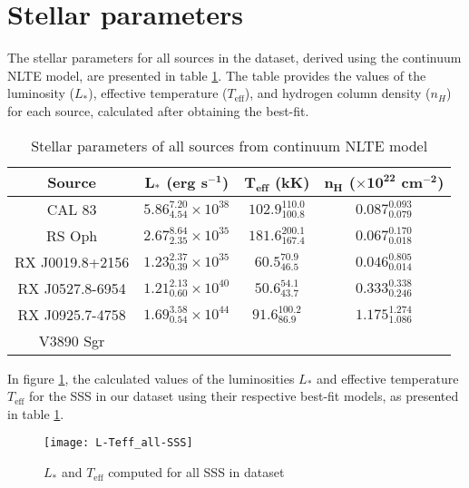 	\section{Stellar parameters}
		The stellar parameters for all sources in the dataset, derived using the continuum NLTE model, are presented in table \ref{tab:sss-stellar-params}. The table provides the values of the luminosity ($L_*$), effective temperature ($T_\text{eff}$), and hydrogen column density ($n_H$) for each source, calculated after obtaining the best-fit.
		\renewcommand{\arraystretch}{1.8}
		\begin{table}[!htb]
			\centering
			\caption{Stellar parameters of all sources from continuum NLTE model}
			\label{tab:sss-stellar-params}
			\begin{tabular}{cccc}
			\hline
			{\textbf{Source}} & {$\boldsymbol{L_*}$ \textbf{(erg s$\boldsymbol{^{-1}}$)}} & {\textbf{$\boldsymbol{T_\text{eff}}$ (kK)}} & {\textbf{$\boldsymbol{n_H}$ ($\boldsymbol{\times 10^{22}}$ cm$\boldsymbol{^{-2}}$)}} \\
			\hline
			{CAL 83} & {$5.86_{4.54}^{7.20}\times 10^{38}$} & {$102.9_{100.8}^{110.0}$} & {$0.087_{0.079}^{0.093}$} \\
			{RS Oph} & {$2.67_{2.35}^{8.64}\times 10^{35}$} & {$181.6_{167.4}^{200.1}$} & {$0.067_{0.018}^{0.170}$} \\
			{RX J0019.8+2156} & {$1.23_{0.39}^{2.37}\times 10^{35}$} & {$60.5_{46.5}^{70.9}$} & {$0.046_{0.014}^{0.805}$} \\
			{RX J0527.8-6954} & {$1.21_{0.60}^{2.13}\times 10^{40}$} & {$50.6_{43.7}^{54.1}$} & {$0.333_{0.246}^{0.338}$} \\
			{RX J0925.7-4758} & {$1.69_{0.54}^{3.58}\times 10^{44}$} & {$91.6_{86.9}^{100.2}$} & {$1.175_{1.086}^{1.274}$} \\
			{V3890 Sgr} & {} & {} & {} \\
			\hline
			\end{tabular}
		\end{table}
		\renewcommand{\arraystretch}{2.2}
		
		In figure \ref{result:L-Teff-SSS}, the calculated values of the luminosities $L_*$ and effective temperature $T_\text{eff}$ for the SSS in our dataset using their respective best-fit models, as presented in table \ref{tab:sss-stellar-params}.
		\begin{figure}[h!]
			\centering
			\texttt{[image: L-Teff\_all-SSS]}
			\caption{$L_*$ and $T_\text{eff}$ computed for all SSS in dataset}
			\label{result:L-Teff-SSS}
		\end{figure}
	

